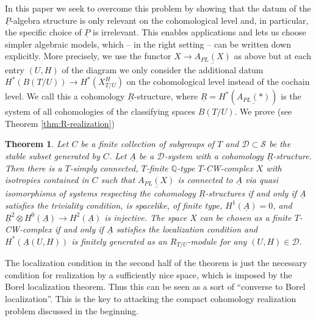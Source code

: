 \documentclass[12pt,a4paper]{article}
\newtheorem*{thm*}{Theorem}
\theoremstyle{definition}
\begin{document}
In this paper we seek to overcome this problem by showing that the datum of the $\underline{P}$-algebra structure is only relevant on the cohomological level and, in particular, the specific choice of $\underline{P}$ is irrelevant. This enables applications and lets us choose simpler algebraic models, which -- in the right setting -- can be written down explicitly. More precisely, we use the functor $X\rightarrow \underline{A_{PL}(X)}$ as above but at each entry $(U,H)$ of the diagram we only consider the additional datum $H^*(B(T/U))\rightarrow H^*(X^H_{T/U})$ on the cohomological level instead of the cochain level. We call this a cohomology $\underline{R}$-structure, where $\underline{R}=H^*(\underline{A_{PL}(*)})$ is the system of all cohomologies of the classifying spaces $B(T/U)$. We prove (see Theorem \ref{thm:R-realization})

\begin{thm*}
Let $C$ be a finite collection of subgroups of $T$ and $\mathcal{D}\subset \mathcal{S}$ be the stable subset generated by $C$. Let $\underline{A}$ be a $\mathcal{D}$-system with a cohomology $\underline{R}$-structure. Then there is a $T$-simply connected, $T$-finite $\mathbb{Q}$-type $T$-CW-complex $X$ with isotropies contained in $C$ such that $\underline{A_{PL}(X)}$ is connected to $\underline{A}$ via quasi isomorphisms of systems respecting the cohomology $\underline{R}$-structures if and only if $\underline{A}$ satisfies the triviality condition, is spacelike, of finite type, $H^1(\underline{A})=0$, and $\underline{R}^2\otimes H^0(\underline{A})\rightarrow H^2(\underline{A})$ is injective. The space $X$ can be chosen as a finite $T$-CW-complex if and only if $\underline{A}$ satisfies the localization condition and $H^*(\underline{A}(U,H))$ is finitely generated as an $R_{T/U}$-module for any $(U,H)\in\mathcal{D}$.
\end{thm*}

The localization condition in the second half of the theorem is just the necessary condition for realization by a sufficiently nice space, which is imposed by the Borel localization theorem. Thus this can be seen as a sort of ``converse to Borel localization''. This is the key to attacking the compact cohomology realization problem discussed in the beginning.
\end{document}
